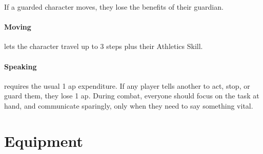 \begin{multicols}{2}
If a guarded character moves, they lose the benefits of their guardian.

\paragraph{Moving}
\label{moving}
lets the character travel up to 3 steps plus their Athletics Skill.

\paragraph{Speaking}
requires the usual 1 \gls{ap} expenditure.
If any player tells another to act, stop, or guard them, they lose 1 \gls{ap}.
During combat, everyone should focus on the task at hand, and communicate sparingly, only when they need to say something vital.

\end{multicols}

\section{Equipment}

